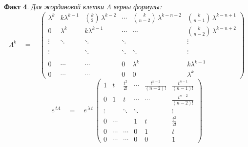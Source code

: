 \documentclass[12pt,a4paper]{article}
\begin{document}
\noindent \textbf{Факт 4}. {\em Для жордановой клетки $\Lambda$ верны формулы:}
\begin{equation}\label{eq.jor-power}
\Lambda^k \quad = \quad
\left(
\begin{array}{lllccl}
\lambda^k & k \lambda^{k-1} &  {k \choose 2} \, \lambda^{k-2} & \cdots & {k \choose n-2} \, \lambda^{k-n+2} & {k \choose n-1} \, \lambda^{k-n+1}\\
   0 &  \lambda^k &  k \lambda^{k-1} &   \cdots & \cdots &{k \choose n-2} \, \lambda^{k-n+2}\\
\vdots & \ddots & \ddots & \ddots & {} & \vdots \\
{}& {} & {} & {} & {} & {}\\
\vdots & {} & \ddots & \ddots & \ddots & \vdots \\
{}& {} & {} & {} & {} & {}\\
0 & \cdots & \cdots & 0 & \lambda^k &  k \lambda^{k-1}\\
0 & \cdots & \cdots  & 0 & 0 & \lambda^k
\end{array}
\right)
\end{equation}
\begin{equation}\label{eq.jor-exp}
e^{\, t \Lambda} \quad = \quad
e^{\, \lambda \, t} \ \left(
\begin{array}{lllccl}
 1 &  t & \frac{t^2}{2!} & \cdots  & \frac{t^{n-2}}{(n-2)!} & \frac{t^{n-1}}{(n-1)!}\\
0& 1 &  t &  \cdots  & \cdots & \frac{t^{n-2}}{(n-2)!} \\
\vdots  & {} & \ddots  & \ddots & {} & \vdots \\
0 & \cdots & {}  & 1 & t & \frac{t^2}{2!} \\
0 & \cdots & \cdots & 0 & 1 &  t\\
0 & \cdots & \cdots  & 0 & 0 & 1
\end{array}
\right)
\end{equation}
\smallskip
\end{document}
